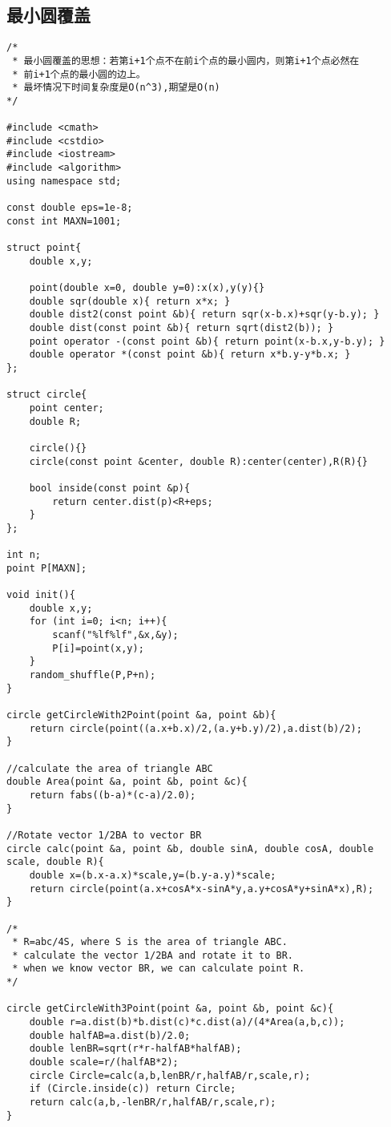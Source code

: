 \subsection{最小圆覆盖}
\begin{verbatim}
/*
 * 最小圆覆盖的思想：若第i+1个点不在前i个点的最小圆内，则第i+1个点必然在
 * 前i+1个点的最小圆的边上。
 * 最坏情况下时间复杂度是O(n^3),期望是O(n)
*/

#include <cmath>
#include <cstdio>
#include <iostream>
#include <algorithm>
using namespace std;

const double eps=1e-8;
const int MAXN=1001;

struct point{
    double x,y;

    point(double x=0, double y=0):x(x),y(y){}
    double sqr(double x){ return x*x; }
    double dist2(const point &b){ return sqr(x-b.x)+sqr(y-b.y); }
    double dist(const point &b){ return sqrt(dist2(b)); }
    point operator -(const point &b){ return point(x-b.x,y-b.y); }
    double operator *(const point &b){ return x*b.y-y*b.x; }
};

struct circle{
    point center;
    double R;

    circle(){}
    circle(const point &center, double R):center(center),R(R){}

    bool inside(const point &p){
        return center.dist(p)<R+eps;
    }
};

int n;
point P[MAXN];

void init(){
    double x,y;
    for (int i=0; i<n; i++){
        scanf("%lf%lf",&x,&y);
        P[i]=point(x,y);
    }
    random_shuffle(P,P+n);
}

circle getCircleWith2Point(point &a, point &b){
    return circle(point((a.x+b.x)/2,(a.y+b.y)/2),a.dist(b)/2);
}

//calculate the area of triangle ABC
double Area(point &a, point &b, point &c){
    return fabs((b-a)*(c-a)/2.0);
}

//Rotate vector 1/2BA to vector BR
circle calc(point &a, point &b, double sinA, double cosA, double scale, double R){
    double x=(b.x-a.x)*scale,y=(b.y-a.y)*scale;
    return circle(point(a.x+cosA*x-sinA*y,a.y+cosA*y+sinA*x),R);
}

/*
 * R=abc/4S, where S is the area of triangle ABC.
 * calculate the vector 1/2BA and rotate it to BR.
 * when we know vector BR, we can calculate point R.
*/

circle getCircleWith3Point(point &a, point &b, point &c){
    double r=a.dist(b)*b.dist(c)*c.dist(a)/(4*Area(a,b,c));
    double halfAB=a.dist(b)/2.0;
    double lenBR=sqrt(r*r-halfAB*halfAB);
    double scale=r/(halfAB*2);
    circle Circle=calc(a,b,lenBR/r,halfAB/r,scale,r);
    if (Circle.inside(c)) return Circle;
    return calc(a,b,-lenBR/r,halfAB/r,scale,r);
}


\end{verbatim}
